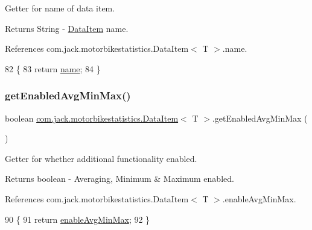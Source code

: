 Getter for name of data item. 

\begin{DoxyReturn}{Returns}
String -\/ \hyperlink{classcom_1_1jack_1_1motorbikestatistics_1_1_data_item}{Data\+Item} name. 
\end{DoxyReturn}


References com.\+jack.\+motorbikestatistics.\+Data\+Item$<$ T $>$.\+name.


\begin{DoxyCode}
82                             \{
83         \textcolor{keywordflow}{return} \hyperlink{classcom_1_1jack_1_1motorbikestatistics_1_1_data_item_a09f8b80430dc1620acbe3532d900fc5a}{name};
84     \}
\end{DoxyCode}
\mbox{\label{classcom_1_1jack_1_1motorbikestatistics_1_1_data_item_af9fd13d6997dbf73dfacaaa33f6f3d9e}} 
\subsubsection{\texorpdfstring{get\+Enabled\+Avg\+Min\+Max()}{getEnabledAvgMinMax()}}
{\footnotesize\ttfamily boolean \hyperlink{classcom_1_1jack_1_1motorbikestatistics_1_1_data_item}{com.\+jack.\+motorbikestatistics.\+Data\+Item}$<$ T $>$.get\+Enabled\+Avg\+Min\+Max (\begin{DoxyParamCaption}{ }\end{DoxyParamCaption})\hspace{0.3cm}{\ttfamily [inline]}}



Getter for whether additional functionality enabled. 

\begin{DoxyReturn}{Returns}
boolean -\/ Averaging, Minimum \& Maximum enabled. 
\end{DoxyReturn}


References com.\+jack.\+motorbikestatistics.\+Data\+Item$<$ T $>$.\+enable\+Avg\+Min\+Max.


\begin{DoxyCode}
90                                          \{
91         \textcolor{keywordflow}{return} \hyperlink{classcom_1_1jack_1_1motorbikestatistics_1_1_data_item_a7cfeefe9064017755f8462421693d2a9}{enableAvgMinMax};
92     \}
\end{DoxyCode}
\mbox{\label{classcom_1_1jack_1_1motorbikestatistics_1_1_data_item_aad19eefe19453103b36ceabca8b1154c}} 

